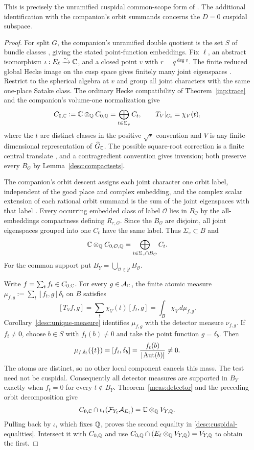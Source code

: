 This is precisely the unramified cuspidal common-scope form of
\cite[Conjectures~3.4.9 and~3.4.11]{GLR}. The additional identification
with the companion's orbit summands concerns the $D=0$ cuspidal subspace.

\begin{proof}
For split $G$, the companion's unramified double quotient is the set $S$
of bundle classes \cite[Section~6.1]{CuspidalArthur}, giving the stated
point-function embeddings. Fix $\ell$, an abstract isomorphism
$\iota:E_\ell\xrightarrow{\sim}\mathbb C$, and a closed point $v$ with
$r=q^{\deg v}$. The finite reduced global Hecke image on the cusp space
gives finitely many joint eigenspaces \cite[Lemma~6.1]{CuspidalArthur}.
Restrict to the spherical algebra at $v$ and group all joint characters
with the same one-place Satake class. The ordinary Hecke compatibility of
Theorem~\ref{inp:trace} and the companion's volume-one normalization give
\[
 C_{0,\mathbb C}:=\mathbb C\otimes_\mathbb Q C_{0,\mathbb Q}
   =\bigoplus_{t\in\Sigma_v}C_t,
 \qquad T_V|_{C_t}=\chi_V(t),
\]
where the $t$ are distinct classes in the positive $\sqrt r$ convention
and $V$ is any finite-dimensional representation of $\widehat G_\mathbb C$.
The possible square-root correction is a finite central translate
\cite[Remark~6.3]{CuspidalArthur}, and a contragredient convention gives
inversion; both preserve every $B_{\mathcal O}$ by
Lemma~\ref{desc:compactsets}.

The companion's orbit descent assigns each joint character one orbit
label, independent of the good place and complex embedding, and the complex
scalar extension of each rational orbit summand is the sum of the joint
eigenspaces with that label
\cite[Lemma~6.2 and Propositions~6.5--6.6]{CuspidalArthur}. Every occurring
embedded class of label $\mathcal O$ lies in $B_{\mathcal O}$ by the
all-embeddings compactness defining $R_{r,\mathcal O}$. Since the
$B_{\mathcal O}$ are disjoint, all joint eigenspaces grouped into one
$C_t$ have the same label. Thus $\Sigma_v\subset B$ and
\[
 \mathbb C\otimes_\mathbb Q C_{0,\mathcal O,\mathbb Q}
   =\bigoplus_{t\in\Sigma_v\cap B_{\mathcal O}}C_t.
\]
For the common support put
$B_Y=\bigcup_{\mathcal O\in\mathscr Y}B_{\mathcal O}$.

Write $f=\sum_t f_t\in C_{0,\mathbb C}$. For every $g\in\mathcal A_\mathbb C$, the finite
atomic measure $\mu_{f,g}:=\sum_t[f_t,g]\delta_t$ on $B$ satisfies
\[
 [T_Vf,g]=\sum_t\chi_V(t)[f_t,g]
           =\int_B\chi_V\,d\mu_{f,g}.
\]
Corollary~\ref{desc:unique-measure} identifies $\mu_{f,g}$ with the
detector measure $\nu_{f,g}$. If $f_t\ne0$, choose $b\in S$ with
$f_t(b)\ne0$ and take the point function $g=\delta_b$. Then
\[
 \mu_{f,\delta_b}(\{t\})=[f_t,\delta_b]
             =\frac{f_t(b)}{|\operatorname{Aut}(b)|}\ne0.
\]
The atoms are distinct, so no other local component cancels this mass.
The test need not be cuspidal. Consequently all detector measures are
supported in $B_Y$ exactly when $f_t=0$ for every $t\notin B_Y$.
Theorem~\ref{meas:detector} and the preceding orbit decomposition give
\[
 C_{0,\mathbb C}\cap\iota_*(\mathcal F_{Y_\ell}\mathcal A_{E_\ell})
   =\mathbb C\otimes_\mathbb Q V_{Y,\mathbb Q}.
\]
Pulling back by $\iota$, which fixes $\mathbb Q$, proves the second equality in
\eqref{desc:cuspidal-equalities}. Intersect it with $C_{0,\mathbb Q}$ and use
$C_{0,\mathbb Q}\cap(E_\ell\otimes_\mathbb Q V_{Y,\mathbb Q})=V_{Y,\mathbb Q}$ to obtain the first.
\end{proof}
